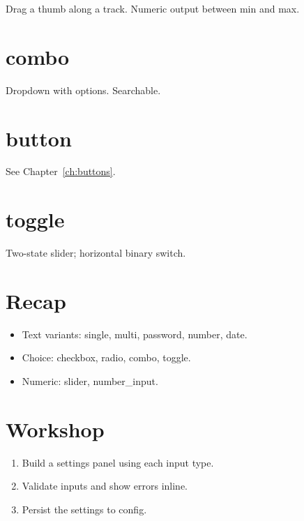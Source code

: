 Drag a thumb along a track. Numeric output between min
and max.

\section{combo}

Dropdown with options. Searchable.

\section{button}

See Chapter~\ref{ch:buttons}.

\section{toggle}

Two-state slider; horizontal binary switch.

\section{Recap}

\begin{recap}
\begin{itemize}[leftmargin=*]
  \item Text variants: single, multi, password, number, date.
  \item Choice: checkbox, radio, combo, toggle.
  \item Numeric: slider, number\_input.
\end{itemize}
\end{recap}

\section*{Workshop}

\begin{enumerate}[leftmargin=*]
  \item Build a settings panel using each input type.
  \item Validate inputs and show errors inline.
  \item Persist the settings to config.
\end{enumerate}
